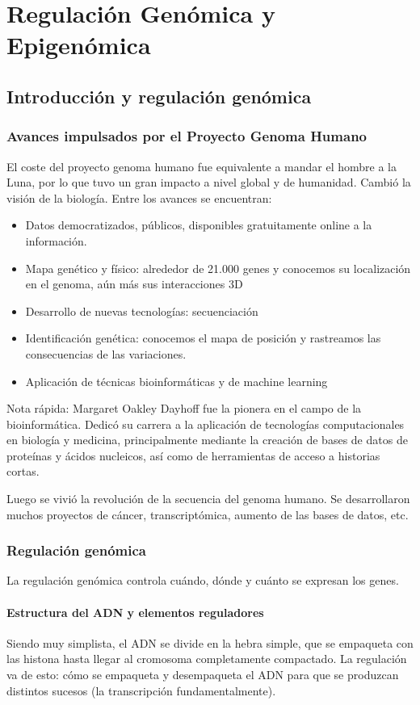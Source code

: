 \part{Regulación Genómica y Epigenómica}
\chapter{Introducción y regulación genómica}
\section{Avances impulsados por el Proyecto Genoma Humano}
El coste del proyecto genoma humano fue equivalente a mandar el hombre a la Luna, por lo que tuvo un gran impacto a nivel global y de humanidad. Cambió la visión de la biología. 
Entre los avances se encuentran:
\begin{itemize}
\item Datos democratizados, públicos, disponibles gratuitamente online a la información.
\item Mapa genético y físico: alrededor de 21.000 genes y conocemos su localización en el genoma, aún más sus interacciones 3D
\item Desarrollo de nuevas tecnologías: secuenciación
\item Identificación genética: conocemos el mapa de posición y rastreamos las consecuencias de las variaciones.
\item Aplicación de técnicas bioinformáticas y de machine learning
\end{itemize}

Nota rápida: Margaret Oakley Dayhoff fue la pionera en el campo de la bioinformática. Dedicó su carrera a la aplicación de tecnologías computacionales en biología y medicina, principalmente mediante la creación de bases de datos de proteínas y ácidos nucleicos, así como de herramientas de acceso a historias cortas.

Luego se vivió la revolución de la secuencia del genoma humano. Se desarrollaron muchos proyectos de cáncer, transcriptómica, aumento de las bases de datos, etc. 

\section{Regulación genómica}
La regulación genómica controla cuándo, dónde y cuánto se expresan los genes.

\subsection{Estructura del ADN y elementos reguladores}
Siendo muy simplista, el ADN se divide en la hebra simple, que se empaqueta con las histona hasta llegar al cromosoma completamente compactado. La regulación va de esto: cómo se empaqueta y desempaqueta el ADN para que se produzcan distintos sucesos (la transcripción fundamentalmente). 

